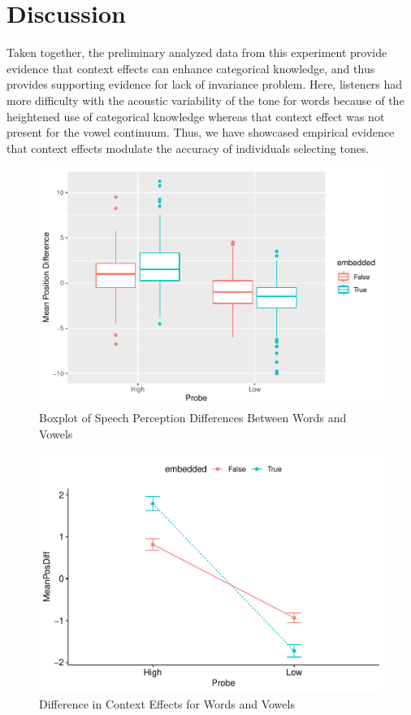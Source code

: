 \documentclass[
  man]{apa6}
\begin{document}
\hypertarget{discussion}{%
\section{Discussion}\label{discussion}}

Taken together, the preliminary analyzed data from this experiment provide evidence that context effects can enhance categorical knowledge, and thus provides supporting evidence for lack of invariance problem. Here, listeners had more difficulty with the acoustic variability of the tone for words because of the heightened use of categorical knowledge whereas that context effect was not present for the vowel continuum. Thus, we have showcased empirical evidence that context effects modulate the accuracy of individuals selecting tones.



\begin{figure}
\centering
\includegraphics{FinalScientificReport_files/figure-latex/GGPlotBoxplot-1.pdf}
\caption{\label{fig:GGPlotBoxplot}Boxplot of Speech Perception Differences Between Words and Vowels}
\end{figure}



\begin{figure}
\centering
\includegraphics{FinalScientificReport_files/figure-latex/GGPlotLine-1.pdf}
\caption{\label{fig:GGPlotLine}Difference in Context Effects for Words and Vowels}
\end{figure}
\end{document}
